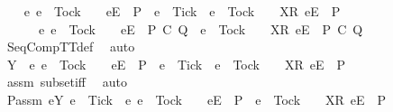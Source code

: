 \begin{isabellebody}
\ \ \isamarkupfalse%
\ {\isachardoublequoteopen}{\isacharbraceleft}e{\isachardot}\ e\ {\isasymnoteq}\ Tock\ {\isasymand}\ {\isasymrho}\ {\isacharat}\ {\isacharbrackleft}{\isacharbrackleft}e{\isacharbrackright}\isactrlsub E{\isacharbrackright}\ {\isasymin}\ P\ {\isasymand}\ e\ {\isasymnoteq}\ Tick\ {\isasymor}\ e\ {\isacharequal}\ Tock\ {\isasymand}\ {\isasymrho}\ {\isacharat}\ {\isacharbrackleft}{\isacharbrackleft}X{\isacharbrackright}\isactrlsub R{\isacharcomma}\ {\isacharbrackleft}e{\isacharbrackright}\isactrlsub E{\isacharbrackright}\ {\isasymin}\ P{\isacharbraceright}\ {\isasymsubseteq}\isanewline
\ \ \ \ \ \ {\isacharbraceleft}e{\isachardot}\ e\ {\isasymnoteq}\ Tock\ {\isasymand}\ {\isasymrho}\ {\isacharat}\ {\isacharbrackleft}{\isacharbrackleft}e{\isacharbrackright}\isactrlsub E{\isacharbrackright}\ {\isasymin}\ P\ {\isacharsemicolon}\isactrlsub C\ Q\ {\isasymor}\ e\ {\isacharequal}\ Tock\ {\isasymand}\ {\isasymrho}\ {\isacharat}\ {\isacharbrackleft}{\isacharbrackleft}X{\isacharbrackright}\isactrlsub R{\isacharcomma}\ {\isacharbrackleft}e{\isacharbrackright}\isactrlsub E{\isacharbrackright}\ {\isasymin}\ P\ {\isacharsemicolon}\isactrlsub C\ Q{\isacharbraceright}{\isachardoublequoteclose}\isanewline
\ \ \ \ \isamarkupfalse%
\ SeqCompTT{\isacharunderscore}def\ \isamarkupfalse%
\ auto\isanewline
\ \ \isamarkupfalse%
\ \isamarkupfalse%
\ {\isachardoublequoteopen}Y\ {\isasyminter}\ {\isacharbraceleft}e{\isachardot}\ e\ {\isasymnoteq}\ Tock\ {\isasymand}\ {\isasymrho}\ {\isacharat}\ {\isacharbrackleft}{\isacharbrackleft}e{\isacharbrackright}\isactrlsub E{\isacharbrackright}\ {\isasymin}\ P\ {\isasymand}\ e\ {\isasymnoteq}\ Tick\ {\isasymor}\ e\ {\isacharequal}\ Tock\ {\isasymand}\ {\isasymrho}\ {\isacharat}\ {\isacharbrackleft}{\isacharbrackleft}X{\isacharbrackright}\isactrlsub R{\isacharcomma}\ {\isacharbrackleft}e{\isacharbrackright}\isactrlsub E{\isacharbrackright}\ {\isasymin}\ P{\isacharbraceright}\ {\isacharequal}\ {\isacharbraceleft}{\isacharbraceright}{\isachardoublequoteclose}\isanewline
\ \ \ \ \isamarkupfalse%
\ assm{}\ subset{\isacharunderscore}iff\ \isamarkupfalse%
\ auto\isanewline
\ \ \isamarkupfalse%
\ \isamarkupfalse%
\ P{\isacharunderscore}assm{}{\isacharcolon}\ {\isachardoublequoteopen}{\isacharbraceleft}e{\isasymin}Y{\isachardot}\ e\ {\isasymnoteq}\ Tick{\isacharbraceright}\ {\isasyminter}\ {\isacharbraceleft}e{\isachardot}\ e\ {\isasymnoteq}\ Tock\ {\isasymand}\ {\isasymrho}\ {\isacharat}\ {\isacharbrackleft}{\isacharbrackleft}e{\isacharbrackright}\isactrlsub E{\isacharbrackright}\ {\isasymin}\ P\ {\isasymor}\ e\ {\isacharequal}\ Tock\ {\isasymand}\ {\isasymrho}\ {\isacharat}\ {\isacharbrackleft}{\isacharbrackleft}X{\isacharbrackright}\isactrlsub R{\isacharcomma}\ {\isacharbrackleft}e{\isacharbrackright}\isactrlsub E{\isacharbrackright}\ {\isasymin}\ P{\isacharbraceright}\ {\isacharequal}\ {\isacharbraceleft}{\isacharbraceright}{\isachardoublequoteclose}\isanewline

\end{isabellebody}
